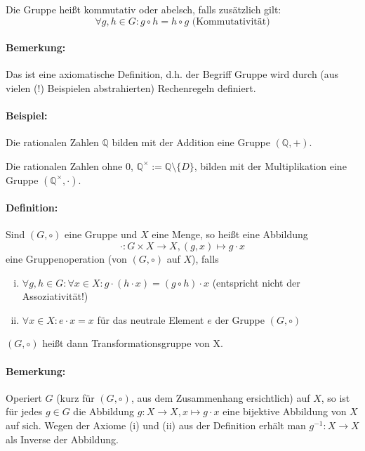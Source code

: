 	Die Gruppe heißt kommutativ oder abelsch, falls zusätzlich gilt:
	\begin{equation*}
		\forall g,h\in G: g\circ h = h\circ g \text{ (Kommutativität)}
	\end{equation*}

\paragraph{Bemerkung:}
	Das ist eine axiomatische Definition, d.h. der Begriff \glqq Gruppe\grqq{} wird durch (aus vielen (!) Beispielen abstrahierten) \glqq Rechenregeln\grqq{} definiert.
\paragraph{Beispiel:}
	Die rationalen Zahlen $\mathbb{Q}$ bilden mit der Addition eine Gruppe $(\mathbb{Q} ,+)$.

	Die rationalen Zahlen ohne $0$, $\mathbb{Q}^{\times} := \mathbb{Q}\setminus \{D\}$, bilden mit der Multiplikation eine Gruppe $(\mathbb{Q}^\times ,\cdot)$.

\paragraph{Definition:}
	Sind $(G,\circ )$ eine Gruppe und $X$ eine Menge, so heißt eine Abbildung
	\begin{equation*}
		\cdot : G\times X\to X, (g,x)\mapsto g\cdot x
	\end{equation*}
	eine Gruppenoperation (von $(G,\circ )$ auf $X$), falls

	\begin{enumerate}[(i)]
		\item $\forall g,h\in G :\forall x\in X: g\cdot (h\cdot x) = (g\circ h)\cdot x$ (entspricht nicht der Assoziativität!)
		\item $\forall x\in X: e\cdot x = x$ für das neutrale Element $e$ der Gruppe $(G,\circ )$
	\end{enumerate}
	$(G,\circ )$ heißt dann Transformationsgruppe von X.

\paragraph{Bemerkung:}
	Operiert $G$ (kurz für $(G,\circ )$, aus dem Zusammenhang ersichtlich) auf $X$, so ist für jedes $g\in G$ die Abbildung $g:X\to X, x\mapsto g\cdot x$ eine bijektive Abbildung von $X$ auf sich. Wegen der Axiome (i) und (ii) aus der Definition erhält man $g^{-1}: X\to X$ als Inverse der Abbildung.
